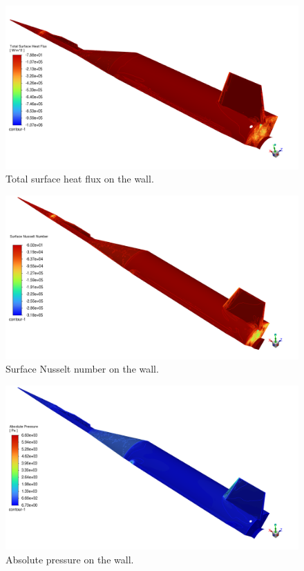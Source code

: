 \documentclass[12pt]{article}
\begin{document}
\begin{figure}[H] %
    \centering
    \includegraphics[width=\linewidth]{figs/t136s/t136s_M5p26_jetOFFVernierOFF_HF.png}
    \caption{Total surface heat flux on the wall.}
    \label{fig:t136s_hf_offoff}
\end{figure}

\begin{figure}[H] %
    \centering
    \includegraphics[width=\linewidth]{figs/t136s/t136s_M5p26_jetOFFVernierOFF_Nu.png}
    \caption{Surface Nusselt number on the wall.}
    \label{fig:t136s_nu_offoff}
\end{figure}

\begin{figure}[H] %
    \centering
    \includegraphics[width=\linewidth]{figs/t136s/t136s_M5p26_jetOFFVernierOFF_pabs.png}
    \caption{Absolute pressure on the wall.}
    \label{fig:t136s_pabs_offoff}
\end{figure}
\end{document}
